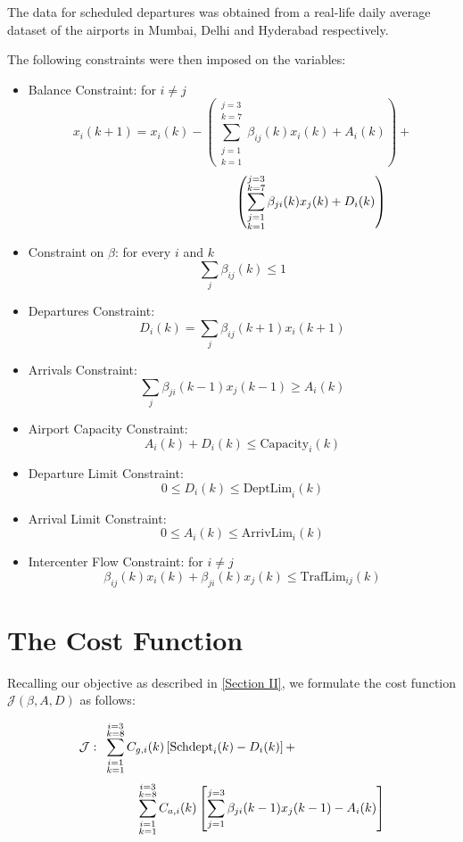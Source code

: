 \documentclass[conference]{IEEEtran}
\begin{document}
The data for scheduled departures was obtained from a real-life daily average dataset of the airports in Mumbai, Delhi and Hyderabad respectively.
\vspace{5mm}

The following constraints were then imposed on the variables:

\begin{itemize}
    \item Balance Constraint: for $i\neq j$
$$x_i(k+1)=x_i(k)-\left(\sum\limits_{\substack{j=1\\k=1}}^{\substack{j=3\\k=7}}\beta_{ij}(k)x_i(k)+A_i(k)\right)+$$ $$\hspace{39mm}\left(\sum\limits_{\substack{j=1\\ k=1}}^{\substack{j=3\\k=7}}\beta_{ji}(k)x_j(k) + D_i(k)\right)$$
    \item Constraint on $\beta$: for every $i$ and $k$
$$\sum_{j}\beta_{ij}(k)\leqslant 1$$
    \item Departures Constraint:
$$D_i(k)=\sum_{j}\beta_{ij}(k+1)x_i(k+1)$$
    \item Arrivals Constraint:
$$\sum_{j}\beta_{ji}(k-1)x_j(k-1)\geqslant A_i(k)$$
    \item Airport Capacity Constraint:
$$A_i(k)+D_i(k)\leqslant\text{Capacity}_i(k)$$
    \item Departure Limit Constraint:
$$0\leqslant D_i(k)\leqslant \text{DeptLim}_i(k)$$
    \item Arrival Limit Constraint: 
$$0\leqslant A_i(k)\leqslant \text{ArrivLim}_i(k)$$
    \item Intercenter Flow Constraint: for $i\neq j$
$$\beta_{ij}(k)x_i(k)+\beta_{ji}(k)x_j(k)\leqslant\text{TrafLim}_{ij}(k)$$
\end{itemize}
\vspace{-1mm}

\section{\large The Cost Function}
\label{sec:sec4}
\vspace{1mm}

Recalling our objective as described in \hyperref[sec:sec2]{[Section II]}, we formulate the cost function $\mathcal{J}(\beta,A,D)$ as follows:
\vspace{-3mm}

$$\mathcal{J}:\text{ }\sum\limits_{\substack{i=1\\ k=1}}^{\substack{i=3\\k=8}}C_{g,i}(k)\left[\text{Schdept}_i(k)-D_i(k)\right]+\hspace{25mm}$$
$$\hspace{17mm}\sum\limits_{\substack{i=1\\ k=1}}^{\substack{i=3\\k=8}}C_{a,i}(k)\left[\sum_{j=1}^{j=3}\beta_{ji}(k-1)x_j(k-1)-A_i(k)\right]$$
\end{document}
